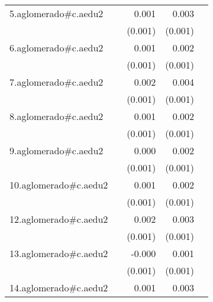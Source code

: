 {\begin{longtable}{l*{4}{D{.}{.}{-1}}}
\addlinespace
5.aglomerado#c.aedu2&                     &       0.001         &       0.003\sym{***}&                     \\
            &                     &     (0.001)         &     (0.001)         &                     \\
\addlinespace
6.aglomerado#c.aedu2&                     &       0.001         &       0.002\sym{*}  &                     \\
            &                     &     (0.001)         &     (0.001)         &                     \\
\addlinespace
7.aglomerado#c.aedu2&                     &       0.002         &       0.004\sym{***}&                     \\
            &                     &     (0.001)         &     (0.001)         &                     \\
\addlinespace
8.aglomerado#c.aedu2&                     &       0.001         &       0.002\sym{*}  &                     \\
            &                     &     (0.001)         &     (0.001)         &                     \\
\addlinespace
9.aglomerado#c.aedu2&                     &       0.000         &       0.002         &                     \\
            &                     &     (0.001)         &     (0.001)         &                     \\
\addlinespace
10.aglomerado#c.aedu2&                     &       0.001         &       0.002\sym{**} &                     \\
            &                     &     (0.001)         &     (0.001)         &                     \\
\addlinespace
12.aglomerado#c.aedu2&                     &       0.002         &       0.003\sym{***}&                     \\
            &                     &     (0.001)         &     (0.001)         &                     \\
\addlinespace
13.aglomerado#c.aedu2&                     &      -0.000         &       0.001         &                     \\
            &                     &     (0.001)         &     (0.001)         &                     \\
\addlinespace
14.aglomerado#c.aedu2&                     &       0.001         &       0.003\sym{***}&                     \\

\end{longtable}}

